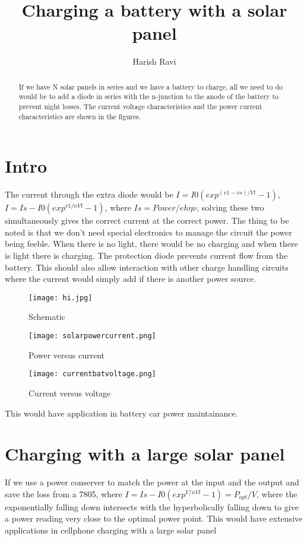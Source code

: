 \documentclass[a4paper]{article}
\title{Charging a battery with a solar panel}
\author{Harish Ravi}
\begin{document}
\maketitle

\begin{abstract}
If we have N solar panels in series and we have a battery to charge, all we need to do would be to add a diode in series with the n-junction to the anode of the battery to prevent night losses. The current voltage characteristics and the power current characteristics are shown in the figures.

\end{abstract}

\section{Intro}
The current through the extra diode would be $I=I0(exp^{(v1-vs)/Vt}-1)$,  $I=Is-I0(exp^{v1/nVt}-1)$, where
$Is=Power/eh\eta\nu$, solving these two simultaneously gives the correct current at the correct power. The thing to be noted is that we don't need special electronics to manage the circuit the power being feeble. When there is no light, there would be no charging and when there is light there is charging. The protection diode prevents current flow from the battery. This should also allow interaction with other charge handling circuits where the current would simply add if there is another power source.
\begin{figure}
\centering
\texttt{[image: hi.jpg]}
\caption{\label{fig:Lorenz}Schematic}
\end{figure}

\begin{figure}
\centering
\texttt{[image: solarpowercurrent.png]}
\caption{\label{fig:Lorenz}Power versus current}
\end{figure}


\begin{figure}
\centering
\texttt{[image: currentbatvoltage.png]}
\caption{\label{fig:Lorenz}Current versus voltage}
\end{figure}

This would have application in battery car power maintainance.

\section{Charging with a large solar panel}
If we use a power conserver to match the power at the input and the output and save the loss from a 7805, where $I=Is-I0(exp^{V/nVt}-1)=P_{opt}/V$, where the exponentially falling down intersects with the hyperbolically falling down to give a power reading very close to the optimal power point. This would have extensive applications in cellphone charging with a large solar panel 
\end{document}
